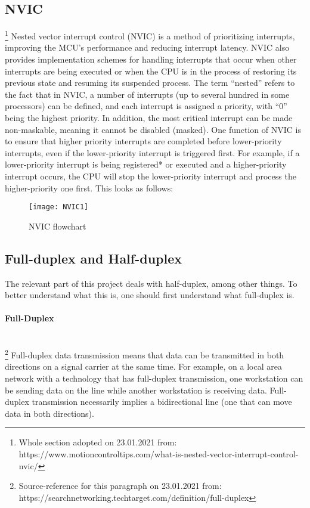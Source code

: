 \documentclass[11pt]{scrartcl}
\begin{document}
	\subsection{NVIC}
	\footnote{\label{foot:2}Whole section adopted on 23.01.2021 from: https://www.motioncontroltips.com/what-is-nested-vector-interrupt-control-nvic/} 
Nested vector interrupt control (NVIC) is a method of prioritizing interrupts, improving the MCU’s performance and reducing interrupt latency. NVIC also provides implementation schemes for handling interrupts that occur when other interrupts are being executed or when the CPU is in the process of restoring its previous state and resuming its suspended process.
\newline\newline
The term “nested” refers to the fact that in NVIC, a number of interrupts (up to several hundred in some processors) can be defined, and each interrupt is assigned a priority, with “0” being the highest priority. In addition, the most critical interrupt can be made non-maskable, meaning it cannot be disabled (masked).
\newline\newline
One function of NVIC is to ensure that higher priority interrupts are completed before lower-priority interrupts, even if the lower-priority interrupt is triggered first. For example, if a lower-priority interrupt is being registered* or executed and a higher-priority interrupt occurs, the CPU will stop the lower-priority interrupt and process the higher-priority one first. This looks as follows:
\newline
	\begin{figure}[h]
		\centering
		\texttt{[image: NVIC1]}
		\caption{NVIC flowchart}
	\end{figure}	



\newpage
	\subsection{Full-duplex and Half-duplex}
	The relevant part of this project deals with half-duplex, among other things. To better understand what this is, one should first understand what full-duplex is.
	\paragraph{Full-Duplex} \mbox{}\\
\footnote{\label{foot:3}Source-reference for this paragraph on 23.01.2021 from: https://searchnetworking.techtarget.com/definition/full-duplex} Full-duplex data transmission means that data can be transmitted in both directions on a signal carrier at the same time. For example, on a local area network with a technology that has full-duplex transmission, one workstation can be sending data on the line while another workstation is receiving data. Full-duplex transmission necessarily implies a bidirectional line (one that can move data in both directions).
\end{document}
